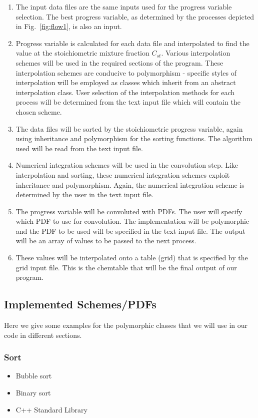 \documentclass[11pt]{article}
\begin{document}
\begin{enumerate}
\item The input data files are the same inputs used for the progress variable selection. The best progress variable, as determined by the processes depicted in Fig.~\ref{fig:flow1}, is also an input.  
\item Progress variable is calculated for each data file and interpolated to find the value at the stoichiometric mixture fraction $C_{st}$. Various interpolation schemes will be used in the required sections of the program.  These interpolation schemes are conducive to polymorphism - specific styles of interpolation will be employed as classes which inherit from an abstract interpolation class.  User selection of the interpolation methods for each process will be determined from the text input file which will contain the chosen scheme.
\item The data files will be sorted by the stoichiometric progress variable, again using inheritance and polymorphism for the sorting functions. The algorithm used will be read from the text input file.
\item Numerical integration schemes will be used in the convolution step.  Like interpolation and sorting, these numerical integration schemes exploit inheritance and polymorphism. Again, the numerical integration scheme is determined by the user in the text input file.
\item The progress variable will be convoluted with PDFs. The user will specify which PDF to use for convolution.  The implementation will be polymorphic and the PDF to be used will be specified in the text input file.  The output will be an array of values to be passed to the next process.
\item These values will be interpolated onto a table (grid) that is specified by the grid input file.  This is the chemtable that will be the final output of our program.  
\end{enumerate}

\subsection{Implemented Schemes/PDFs}
Here we give some examples for the polymorphic classes that we will use in our code in different sections. 

\subsubsection{Sort}
\begin{itemize}
\item Bubble sort 
\item Binary sort
\item C++ Standard Library
\end{itemize}
\end{document}
